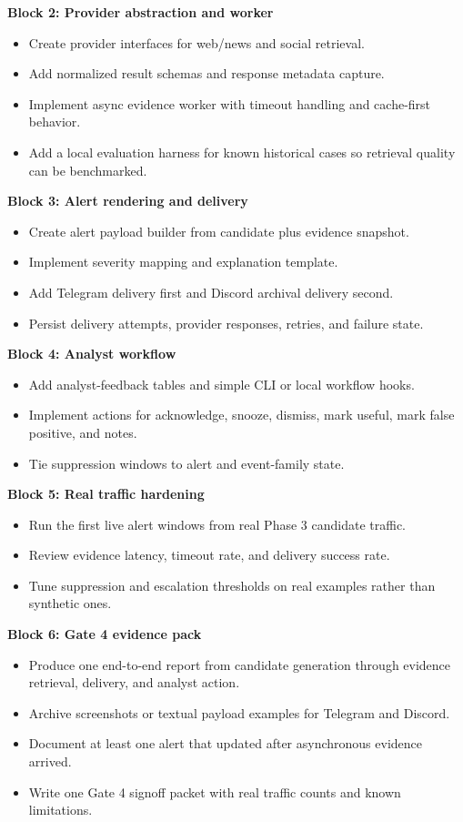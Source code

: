\documentclass{article}
\begin{document}
\textbf{Block 2: Provider abstraction and worker}
\begin{itemize}
\item Create provider interfaces for web/news and social retrieval.
\item Add normalized result schemas and response metadata capture.
\item Implement async evidence worker with timeout handling and cache-first behavior.
\item Add a local evaluation harness for known historical cases so retrieval quality can be benchmarked.
\end{itemize}

\textbf{Block 3: Alert rendering and delivery}
\begin{itemize}
\item Create alert payload builder from candidate plus evidence snapshot.
\item Implement severity mapping and explanation template.
\item Add Telegram delivery first and Discord archival delivery second.
\item Persist delivery attempts, provider responses, retries, and failure state.
\end{itemize}

\textbf{Block 4: Analyst workflow}
\begin{itemize}
\item Add analyst-feedback tables and simple CLI or local workflow hooks.
\item Implement actions for acknowledge, snooze, dismiss, mark useful, mark false positive, and notes.
\item Tie suppression windows to alert and event-family state.
\end{itemize}

\textbf{Block 5: Real traffic hardening}
\begin{itemize}
\item Run the first live alert windows from real Phase 3 candidate traffic.
\item Review evidence latency, timeout rate, and delivery success rate.
\item Tune suppression and escalation thresholds on real examples rather than synthetic ones.
\end{itemize}

\textbf{Block 6: Gate 4 evidence pack}
\begin{itemize}
\item Produce one end-to-end report from candidate generation through evidence retrieval, delivery, and analyst action.
\item Archive screenshots or textual payload examples for Telegram and Discord.
\item Document at least one alert that updated after asynchronous evidence arrived.
\item Write one Gate 4 signoff packet with real traffic counts and known limitations.
\end{itemize}
\end{document}
